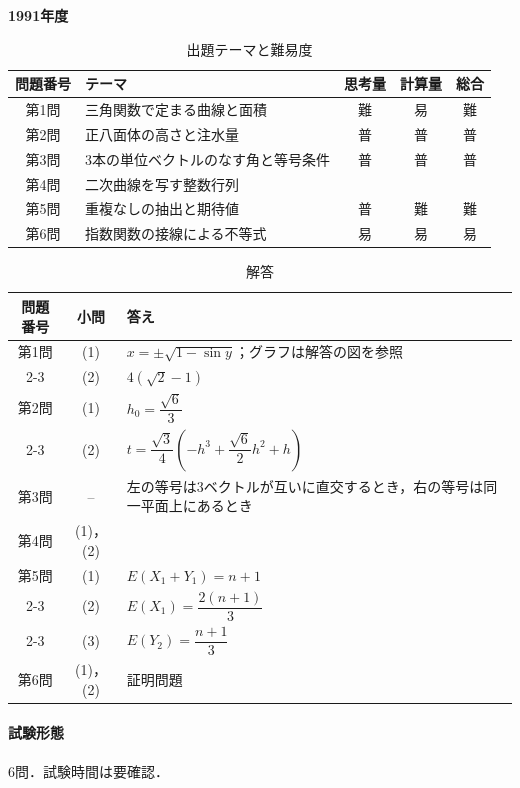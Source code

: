 \documentclass[../../main.tex]{subfiles}
\begin{document}
\begin{center}
  {\fontsize{48pt}{58pt}\selectfont \textbf{1991}\normalsize\textbf{年度}}
\end{center}

\begin{table}[htb]
  \centering
  \caption{出題テーマと難易度}
  \begin{tabular}{|c|p{6.2cm}|c|c|c|}
    \hline
    \textbf{問題番号} & \textbf{テーマ} & \textbf{思考量} & \textbf{計算量} & \textbf{総合} \\
    \hline
    第1問 & 三角関数で定まる曲線と面積 & 難 & 易 & 難 \\
    \hline
    第2問 & 正八面体の高さと注水量 & 普 & 普 & 普 \\
    \hline
    第3問 & 3本の単位ベクトルのなす角と等号条件 & 普 & 普 & 普 \\
    \hline
    第4問 & 二次曲線を写す整数行列 &  &  &  \\
    \hline
    第5問 & 重複なしの抽出と期待値 & 普 & 難 & 難 \\
    \hline
    第6問 & 指数関数の接線による不等式 & 易 & 易 & 易 \\
    \hline
  \end{tabular}
\end{table}

\begin{table}[htb]
  \centering
  \caption{解答}
  \renewcommand{\arraystretch}{1.4}
  \begin{tabular}{|c|c|p{9cm}|}
    \hline
    \textbf{問題番号} & \textbf{小問} & \textbf{答え} \\
    \hline
    第1問 & (1) & $x=\pm\sqrt{1-\sin y}$；グラフは解答の図を参照 \\
    \cline{2-3}
    & (2) & $4(\sqrt{2}-1)$ \\
    \hline
    第2問 & (1) & $h_0=\dfrac{\sqrt{6}}{3}$ \\
    \cline{2-3}
    & (2) & $t=\dfrac{\sqrt{3}}{4}\left(-h^3+\dfrac{\sqrt{6}}{2}h^2+h\right)$ \\
    \hline
    第3問 & -- & 左の等号は3ベクトルが互いに直交するとき，右の等号は同一平面上にあるとき \\
    \hline
    第4問 & (1)，(2) &  \\
    \hline
    第5問 & (1) & $E(X_1+Y_1)=n+1$ \\
    \cline{2-3}
    & (2) & $E(X_1)=\dfrac{2(n+1)}{3}$ \\
    \cline{2-3}
    & (3) & $E(Y_2)=\dfrac{n+1}{3}$ \\
    \hline
    第6問 & (1)，(2) & 証明問題 \\
    \hline
  \end{tabular}
\end{table}

\paragraph{試験形態}
6問．試験時間は要確認．
\end{document}

